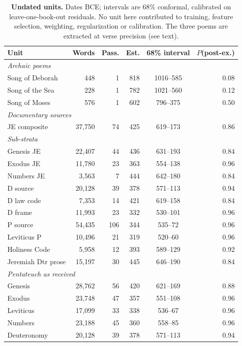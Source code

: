 \begin{table}[!ht]
\centering
\footnotesize
\caption{\textbf{Undated units.}  Dates BCE; intervals are 68\% conformal, calibrated on leave-one-book-out residuals.  No unit here contributed to training, feature selection, weighting, regularization or calibration.  The three poems are extracted at verse precision (see text).}
\label{tab:targets}
\begin{tabular}{lrrrcr}
\toprule
\textbf{Unit} & \textbf{Words} & \textbf{Pass.} & \textbf{Est.} & \textbf{68\% interval} & \textbf{$P$(post-ex.)} \\
\midrule
\multicolumn{6}{l}{\textit{Archaic poems}} \\
\quad Song of Deborah & 448 & 1 & 818 & 1016--585 & 0.08 \\
\quad Song of the Sea & 228 & 1 & 782 & 1021--560 & 0.12 \\
\quad Song of Moses & 576 & 1 & 602 & 796--375 & 0.50 \\
\midrule
\multicolumn{6}{l}{\textit{Documentary sources}} \\
\quad JE composite & 37,750 & 74 & 425 & 619--173 & 0.86 \\
\midrule
\multicolumn{6}{l}{\textit{Sub-strata}} \\
\quad Genesis JE & 22,407 & 44 & 436 & 631--193 & 0.84 \\
\quad Exodus JE & 11,780 & 23 & 363 & 554--138 & 0.96 \\
\quad Numbers JE & 3,563 & 7 & 444 & 642--180 & 0.84 \\
\quad D source & 20,128 & 39 & 378 & 571--113 & 0.94 \\
\quad D law code & 7,353 & 14 & 421 & 619--158 & 0.84 \\
\quad D frame & 11,993 & 23 & 332 & 530--101 & 0.96 \\
\quad P source & 54,435 & 106 & 344 & 535--72 & 0.96 \\
\quad Leviticus P & 10,496 & 21 & 319 & 520--60 & 0.96 \\
\quad Holiness Code & 5,958 & 12 & 393 & 589--129 & 0.92 \\
\quad Jeremiah Dtr prose & 15,197 & 30 & 445 & 646--190 & 0.84 \\
\midrule
\multicolumn{6}{l}{\textit{Pentateuch as received}} \\
\quad Genesis & 28,762 & 56 & 420 & 621--169 & 0.88 \\
\quad Exodus & 23,748 & 47 & 357 & 551--108 & 0.96 \\
\quad Leviticus & 17,099 & 33 & 338 & 536--67 & 0.96 \\
\quad Numbers & 23,188 & 45 & 360 & 558--85 & 0.96 \\
\quad Deuteronomy & 20,128 & 39 & 378 & 571--113 & 0.94 \\
\bottomrule
\end{tabular}
\end{table}

